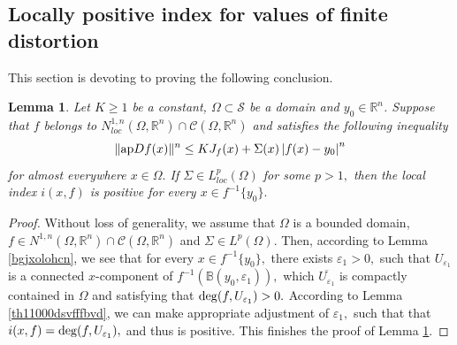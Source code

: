 \documentclass[11pt,twoside]{article}
\newtheorem{lem}[thm]{Lemma}
\theoremstyle{definition}
\theoremstyle{remark}
\newcommand{\abs}[1]{\left|#1\right|}
\begin{document}
\subsection{Locally positive index for values of finite distortion} 
This section is devoting to proving the following conclusion.
\begin{lem}\label{th11000dsvfffbvdasxcscs}
Let $K\geq1$ be a constant, $\Omega\subset\mathcal{S}$ be a domain and $y_{0}\in\mathbb{R}^{n}$. Suppose that $f$ belongs to  $N_{loc}^{1,n}(\Omega,\mathbb{R}^{n})\cap \mathcal{C}(\Omega,\mathbb{R}^{n})$ and satisfies the following inequality
\begin{equation}
\| {\rm ap}Df(x)\|^{n}\leq KJ_{f}(x)+\Sigma(x)\abs{f(x)-y_{0}}^{n}
\end{equation}
for almost everywhere $x\in\Omega.$ If $\Sigma\in L_{loc}^{p}(\Omega)$ for some $p>1,$
then the local index $i(x,f)$ is positive for every $x\in f^{-1}\{y_{0}\}.$
\end{lem}
\begin{proof}
Without loss of generality, we assume that $\Omega$ is a bounded domain, $f\in N^{1,n}(\Omega,\mathbb{R}^{n})\cap \mathcal{C}(\Omega,\mathbb{R}^{n})$ and $\Sigma\in L^{p}(\Omega).$
Then, according to  Lemma \ref{bgjxolohcn}, we see that for  every $x\in f^{-1}\{y_{0}\},$ there exists $\varepsilon_{1}>0,$ such that $U_{\varepsilon_{1}}$ is a connected $x$-component of $f^{-1}(\mathbb{B}(y_{0},\varepsilon_{1})),$ which $\overline{U_{\varepsilon_{1}}}$ is compactly contained in $\Omega$ and satisfying that
${\rm deg}(f,U_{\varepsilon_{1}})>0.$ According to Lemma \ref{th11000dsvfffbvd}, we can make appropriate adjustment of $\varepsilon_{1},$ such that that $i(x,f)={\rm deg}(f,U_{\varepsilon_{1}}),$ and thus is positive. This finishes the proof of Lemma 
\ref{th11000dsvfffbvdasxcscs}.
\end{proof}
\end{document}
